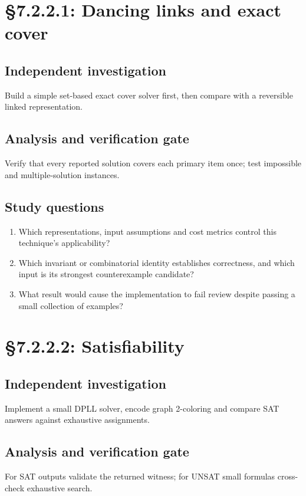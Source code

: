 \documentclass[11pt,letterpaper]{article}
\begin{document}
\section{\S 7.2.2.1: Dancing links and exact cover}
\subsection{Independent investigation}
Build a simple set-based exact cover solver first, then compare with a reversible linked representation.
\subsection{Analysis and verification gate}
Verify that every reported solution covers each primary item once; test impossible and multiple-solution instances.
\subsection{Study questions}
\begin{enumerate}
\item Which representations, input assumptions and cost metrics control this technique's applicability?
\item Which invariant or combinatorial identity establishes correctness, and which input is its strongest counterexample candidate?
\item What result would cause the implementation to fail review despite passing a small collection of examples?
\end{enumerate}

\section{\S 7.2.2.2: Satisfiability}
\subsection{Independent investigation}
Implement a small DPLL solver, encode graph 2-coloring and compare SAT answers against exhaustive assignments.
\subsection{Analysis and verification gate}
For SAT outputs validate the returned witness; for UNSAT small formulas cross-check exhaustive search.
\end{document}
